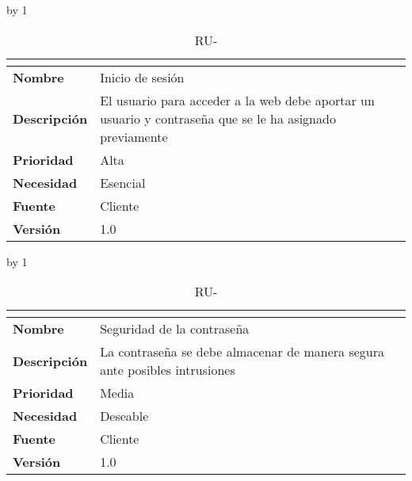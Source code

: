\advance\ru by 1
\begin{table}[H]
	\caption{RU-\number\ru}
	\begin{tabular}{|l|p{}|}
		\hline
		\multicolumn{2}{|c|}{\cellcolor[HTML]{BFBFBF}{\color[HTML]{000000} \textbf{RU-\number\ru}}} \\ \hline
		\textbf{Nombre}      & Inicio de sesión                                                                                        \\ \hline
		\textbf{Descripción} & El usuario para acceder a la web debe aportar un usuario y contraseña que se le ha asignado previamente \\ \hline
		\textbf{Prioridad}   & Alta                                                                                                    \\ \hline
		\textbf{Necesidad}   & Esencial                                                                                                \\ \hline
		\textbf{Fuente}      & Cliente                                                                                                 \\ \hline
		\textbf{Versión}     & 1.0                                                                                                     \\ \hline
	\end{tabular}
\end{table}
\advance\ru by 1
\begin{table}[H]
	\caption{RU-\number\ru}
	\begin{tabular}{|l|p{}|}
		\hline
		\multicolumn{2}{|c|}{\cellcolor[HTML]{BFBFBF}{\color[HTML]{000000} \textbf{RU-\number\ru}}} \\ \hline
		\textbf{Nombre}      & Seguridad de la contraseña                                                 \\ \hline
		\textbf{Descripción} & La contraseña se debe almacenar de manera segura ante posibles intrusiones \\ \hline
		\textbf{Prioridad}   & Media                                                                      \\ \hline
		\textbf{Necesidad}   & Deseable                                                                   \\ \hline
		\textbf{Fuente}      & Cliente                                                                    \\ \hline
		\textbf{Versión}     & 1.0                                                                        \\ \hline
	\end{tabular}
\end{table}
